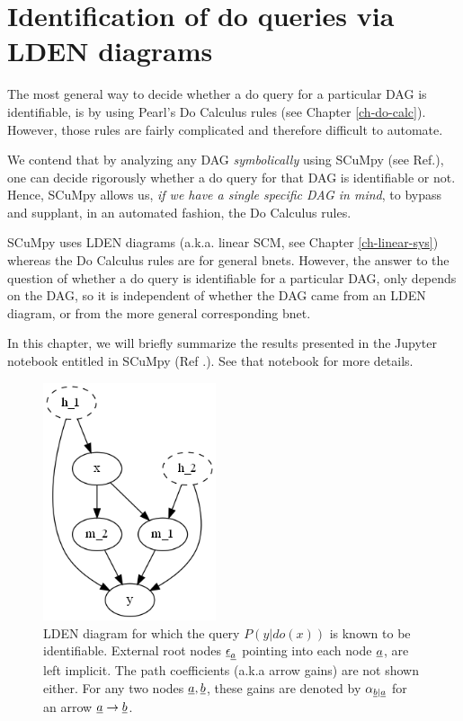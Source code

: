 \chapter{Identification of do queries via LDEN
diagrams}
\label{ch-iden-LDEN}

The most general way to decide whether a do query for
a particular DAG is identifiable, is by using Pearl's
Do Calculus rules (see Chapter \ref{ch-do-calc}). However, those rules are fairly 
complicated and therefore difficult to automate.


We contend that by analyzing any DAG {\it symbolically} using 
SCuMpy (see Ref.\cite{scumpy}), one can decide rigorously 
whether a
do query for that DAG is identifiable or not. Hence, SCuMpy
allows us, {\it if we have a single specific DAG in mind}, to bypass and supplant, in an automated 
fashion, the Do Calculus rules.

SCuMpy uses
LDEN diagrams (a.k.a. linear SCM, see Chapter \ref{ch-linear-sys}) whereas
the Do Calculus rules are for general bnets.
However, the answer to the question
of whether a do query is identifiable
for a particular DAG,
only depends on the DAG,
so it is independent of whether
the DAG came from an LDEN diagram, or from
the more general corresponding bnet.


In this chapter,
we will briefly summarize the results
presented in the
Jupyter notebook entitled  in SCuMpy (Ref
.\cite{scumpy}). See that notebook
for more details.

\begin{figure}[h!]
\centering
\includegraphics[width=2in]
{iden-LDEN/uncon-children.png}
\caption{LDEN diagram for which 
the query $P(y|do(x))$
is  known to be identifiable.
External root nodes $\rveps_\rva$ 
pointing into each node $\rva$,
are left implicit.
The path coefficients (a.k.a
arrow gains)
are not shown either. 
For any two nodes $\rva, \rvb$,
these gains
 are denoted
   by $\alp_{\rvb|\rva}$
for an arrow $\rva\rarrow \rvb$.}
\label{fig-uncon-children}
\end{figure}

